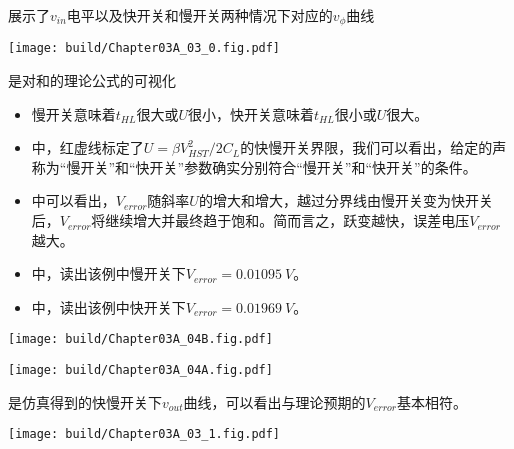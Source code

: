 展示了$v_{in}$电平以及快开关和慢开关两种情况下对应的$v_{\phi}$曲线
\begin{Figure}
    \texttt{[image: build/Chapter03A\_03\_0.fig.pdf]}
\end{Figure}

是对和的理论公式的可视化
\begin{itemize}
    \item 慢开关意味着$t_{HL}$很大或$U$很小，快开关意味着$t_{HL}$很小或$U$很大。
    \item {}中，红虚线标定了$U=\beta V_{HST}^2/2C_L$的快慢开关界限，我们可以看出，给定的声称为“慢开关”和“快开关”参数确实分别符合“慢开关”和“快开关”的条件。
    \item {}中可以看出，$V_{error}$随斜率$U$的增大和增大，越过分界线由慢开关变为快开关后，$V_{error}$将继续增大并最终趋于饱和。简而言之，跃变越快，误差电压$V_{error}$越大。
    \item {}中，读出该例中慢开关下$V_{error}=\SI{0.01095}{V}$。
    \item {}中，读出该例中快开关下$V_{error}=\SI{0.01969}{V}$。
\end{itemize}

\begin{Figure}
    \begin{FigureSub}[斜率与下降沿时间]
        \texttt{[image: build/Chapter03A\_04B.fig.pdf]}
    \end{FigureSub}
    \begin{FigureSub}[斜率与误差电压]
        \texttt{[image: build/Chapter03A\_04A.fig.pdf]}
    \end{FigureSub}
\end{Figure}

是仿真得到的快慢开关下$v_{out}$曲线，可以看出与理论预期的$V_{error}$基本相符。
\begin{Figure}
    \texttt{[image: build/Chapter03A\_03\_1.fig.pdf]}
\end{Figure}